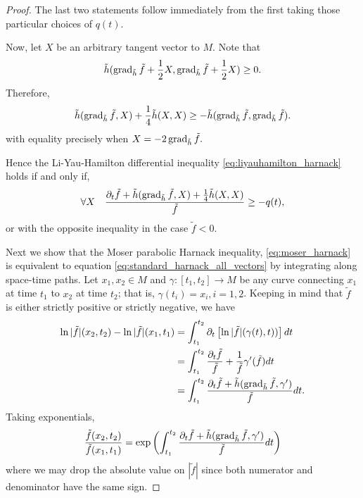 \begin{proof}
The last two statements follow immediately from the first taking those particular choices of $q(t)$.

Now, let $X$ be an arbitrary tangent vector to $M$. Note that
\[
\tilde{h}(\operatorname{grad}_{\tilde{h}} \tilde{f} + \frac{1}{2}X, \operatorname{grad}_{\tilde{h}} \tilde{f} + \frac{1}{2}X)\geq 0.
\]
Therefore,
\begin{equation}
\label{eq:CauchySchwarzPolarisation}
\tilde{h}(\operatorname{grad}_{\tilde{h}} \tilde{f}, X) + \frac{1}{4} \tilde{h}(X, X) \geq - \tilde{h}(\operatorname{grad}_{\tilde{h}} \tilde{f}, \operatorname{grad}_{\tilde{h}} \tilde{f}).
\end{equation}
with equality precisely when $X=-2\operatorname{grad}_{\tilde{h}} \tilde{f}.$

Hence the Li-Yau-Hamilton differential inequality \eqref{eq:liyauhamilton_harnack} holds if and only if,
\begin{equation}
\label{eq:standard_harnack_all_vectors}
\forall X \quad \frac{\partial_t \tilde{f} + \tilde{h}(\operatorname{grad}_{\tilde{h}} \tilde{f}, X)+ \frac{1}{4} \tilde{h}(X, X)}{\tilde{f}} \geq - q(t),
\end{equation}
or with the opposite inequality in the case $\tilde{f} < 0$.

Next we show that the Moser parabolic Harnack inequality, \eqref{eq:moser_harnack} is equivalent to equation \eqref{eq:standard_harnack_all_vectors} by integrating along space-time paths. Let $x_1,x_2 \in M$ and $\gamma : [t_1, t_2] \to M$ be any curve connecting $x_1$ at time $t_1$ to $x_2$ at time $t_2$; that is, $\gamma(t_i) = x_i, i = 1,2$. Keeping in mind that $\tilde{f}$ is either strictly positive or strictly negative, we have
\[
\begin{split}
\ln |\tilde{f}| (x_2, t_2) - \ln |\tilde{f}| (x_1, t_1) &= \int_{t_1}^{t_2} \partial_t \left[\ln |\tilde{f}| (\gamma(t), t))\right] dt \\
&= \int_{t_1}^{t_2} \frac{\partial_t \tilde{f}}{\tilde{f}} + \frac{1}{\tilde{f}} \gamma'(\tilde{f})  dt \\
&= \int_{t_1}^{t_2} \frac{\partial_t \tilde{f} + \tilde{h} (\operatorname{grad}_{\tilde{h}} \tilde{f}, \gamma')}{\tilde{f}} dt.
\end{split}
\]
Taking exponentials,
\begin{equation}
\label{eq:exponential_harnack}
\frac{\tilde{f} (x_2, t_2)}{\tilde{f} (x_1, t_1)} = \exp \left(\int_{t_1}^{t_2} \frac{\partial_t \tilde{f} + \tilde{h} (\operatorname{grad}_{\tilde{h}} \tilde{f}, \gamma')}{\tilde{f}} dt\right)
\end{equation}
where we may drop the absolute value on $|\tilde{f}|$ since both numerator and denominator have the same sign.


\end{proof}
